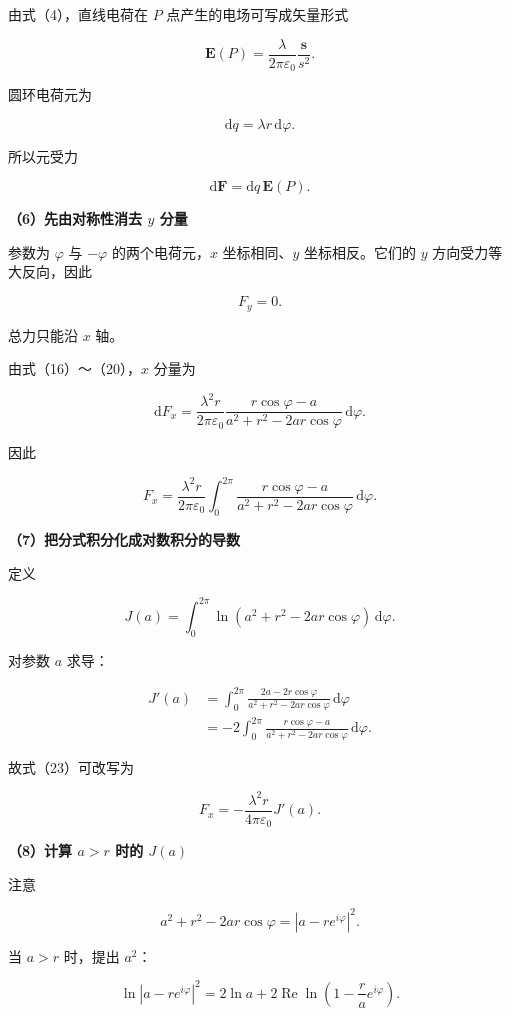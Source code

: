 \documentclass[12pt,a4paper,UTF8]{ctexart}
\begin{document}
由式（4），直线电荷在 \(P\) 点产生的电场可写成矢量形式

\[
\boldsymbol E(P)
=\frac{\lambda}{2\pi\varepsilon_0}
\frac{\boldsymbol s}{s^2}.
\tag{18}
\]

圆环电荷元为

\[
\mathrm dq=\lambda r\,\mathrm d\varphi.
\tag{19}
\]

所以元受力

\[
\mathrm d\boldsymbol F
=\mathrm dq\,\boldsymbol E(P).
\tag{20}
\]

\textbf{（6）先由对称性消去 \(y\) 分量}

参数为 \(\varphi\) 与 \(-\varphi\) 的两个电荷元，\(x\) 坐标相同、\(y\)
坐标相反。它们的 \(y\) 方向受力等大反向，因此

\[
\boxed{F_y=0}.
\tag{21}
\]

总力只能沿 \(x\) 轴。

由式（16）～（20），\(x\) 分量为

\[
\mathrm dF_x
=\frac{\lambda^2r}{2\pi\varepsilon_0}
\frac{r\cos\varphi-a}
{a^2+r^2-2ar\cos\varphi}
\,\mathrm d\varphi.
\tag{22}
\]

因此

\[
F_x
=\frac{\lambda^2r}{2\pi\varepsilon_0}
\int_0^{2\pi}
\frac{r\cos\varphi-a}
{a^2+r^2-2ar\cos\varphi}
\,\mathrm d\varphi.
\tag{23}
\]

\textbf{（7）把分式积分化成对数积分的导数}

定义

\[
J(a)=\int_0^{2\pi}
\ln\!\left(a^2+r^2-2ar\cos\varphi\right)
\,\mathrm d\varphi.
\tag{24}
\]

对参数 \(a\) 求导：

\[
\begin{aligned}
J'(a)
&=\int_0^{2\pi}
\frac{2a-2r\cos\varphi}
{a^2+r^2-2ar\cos\varphi}
\,\mathrm d\varphi\\
&=-2\int_0^{2\pi}
\frac{r\cos\varphi-a}
{a^2+r^2-2ar\cos\varphi}
\,\mathrm d\varphi.
\end{aligned}
\tag{25}
\]

故式（23）可改写为

\[
\boxed{
F_x=-\frac{\lambda^2r}{4\pi\varepsilon_0}J'(a)
}.
\tag{26}
\]

\textbf{（8）计算 \(a>r\) 时的 \(J(a)\)}

注意

\[
a^2+r^2-2ar\cos\varphi
=|a-re^{i\varphi}|^2.
\tag{27}
\]

当 \(a>r\) 时，提出 \(a^2\)：

\[
\ln|a-re^{i\varphi}|^2
=2\ln a
+2\operatorname{Re}\ln\!\left(1-\frac rae^{i\varphi}\right).
\tag{28}
\]
\end{document}
